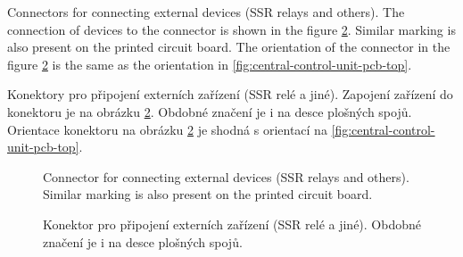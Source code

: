 \begin{English}
Connectors for connecting external devices (SSR relays and others). The connection of devices to the connector is shown in the figure \ref{fig:central-control-unit-terminal-block-relays}. Similar marking is also present on the printed circuit board. The orientation of the connector in the figure \ref{fig:central-control-unit-terminal-block-relays} is the same as the orientation in \ref{fig:central-control-unit-pcb-top}.
\end{English}

\begin{Czech}
Konektory pro připojení externích zařízení (SSR relé a jiné).  Zapojení zařízení do konektoru je na obrázku \ref{fig:central-control-unit-terminal-block-relays}. Obdobné značení je i na desce plošných spojů. Orientace konektoru na obrázku \ref{fig:central-control-unit-terminal-block-relays} je shodná s orientací na \ref{fig:central-control-unit-pcb-top}.
\end{Czech}


\begin{English}
\begin{figure}[H]
    \centering
    \def\svgwidth{0.15\columnwidth}
    \graphicspath{{pictures/all/hardware/svg/}}
    
    \caption{Connector for connecting external devices (SSR relays and others). Similar marking is also present on the printed circuit board.}
    \label{fig:central-control-unit-terminal-block-relays}
\end{figure}
\end{English}

\begin{Czech}
\begin{figure}[H]
    \centering
    \def\svgwidth{0.15\columnwidth}
    \graphicspath{{pictures/all/hardware/svg/}}
    
    \caption{Konektor pro připojení externích zařízení (SSR relé a jiné). Obdobné značení je i na desce plošných spojů.}
    \label{fig:central-control-unit-terminal-block-relays}
\end{figure}
\end{Czech}


\begin{English}
\end{English}

\begin{Czech}
\end{Czech}


